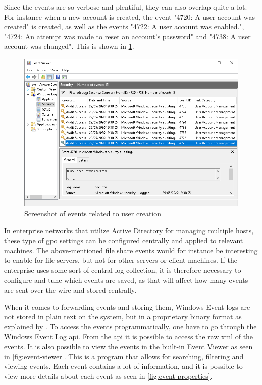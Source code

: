 Since the events are so verbose and plentiful, they can also overlap quite a lot. For instance when a new account is created, the event "4720: A user account was created" is created, as well as the events "4722: A user account was enabled.", "4724: An attempt was made to reset an account's password" and "4738: A user account was changed". This is shown in \cref{fig:create-user-events}.

\begin{figure}[htbp]  %
  \centering
  \includegraphics[width=\textwidth]{figures/create-user-events.png}
  \caption[Screenshot of events related to user creation]{Screenshot of events related to user creation}
  \label{fig:create-user-events}
\end{figure}

In enterprise networks that utilize Active Directory for managing multiple hosts, these type of \acrshort{gpo} settings can be configured centrally and applied to relevant machines. The above-mentioned file share events would for instance be interesting to enable for file servers, but not for other servers or client machines. If the enterprise uses some sort of central log collection, it is therefore necessary to configure and tune which events are saved, as that will affect how many events are sent over the wire and stored centrally.

When it comes to forwarding events and storing them, Windows Event logs are not stored in plain text on the system, but in a proprietary binary format as explained by \textcite{Schuster_2007}. To access the events programmatically, one have to go through the Windows Event Log \acrfull{api}\cite{Windows_event_log_api}. From the \acrshort{api} it is possible to access the raw \acrshort{xml} of the events. It is also possible to view the events in the built-in Event Viewer as seen in \cref{fig:event-viewer}. This is a program that allows for searching, filtering and viewing events. Each event contains a lot of information, and it is possible to view more details about each event as seen in \cref{fig:event-properties}.

